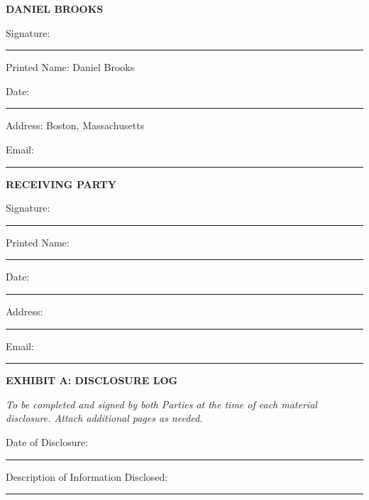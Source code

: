 \documentclass{article}
\begin{document}
\noindent
\begin{minipage}[t]{0.45\textwidth}
\textbf{DANIEL BROOKS}

\vspace{2em}
\noindent Signature: \rule{5cm}{0.4pt}

\vspace{1em}
\noindent Printed Name: Daniel Brooks

\vspace{1em}
\noindent Date: \rule{5cm}{0.4pt}

\vspace{1em}
\noindent Address: Boston, Massachusetts

\vspace{1em}
\noindent Email: \rule{5cm}{0.4pt}
\end{minipage}
\hfill
\begin{minipage}[t]{0.45\textwidth}
\textbf{RECEIVING PARTY}

\vspace{2em}
\noindent Signature: \rule{5cm}{0.4pt}

\vspace{1em}
\noindent Printed Name: \rule{4cm}{0.4pt}

\vspace{1em}
\noindent Date: \rule{5cm}{0.4pt}

\vspace{1em}
\noindent Address: \rule{5cm}{0.4pt}

\vspace{1em}
\noindent Email: \rule{5cm}{0.4pt}
\end{minipage}

\newpage

\begin{center}
{\large\bfseries EXHIBIT A: DISCLOSURE LOG}
\end{center}

\vspace{0.5em}
\noindent\textit{To be completed and signed by both Parties at the time of each material disclosure. Attach additional pages as needed.}

\vspace{2em}

\noindent Date of Disclosure: \rule{10cm}{0.4pt}

\vspace{1.5em}
\noindent Description of Information Disclosed:

\vspace{0.5em}
\noindent\rule{\textwidth}{0.4pt}
\end{document}
